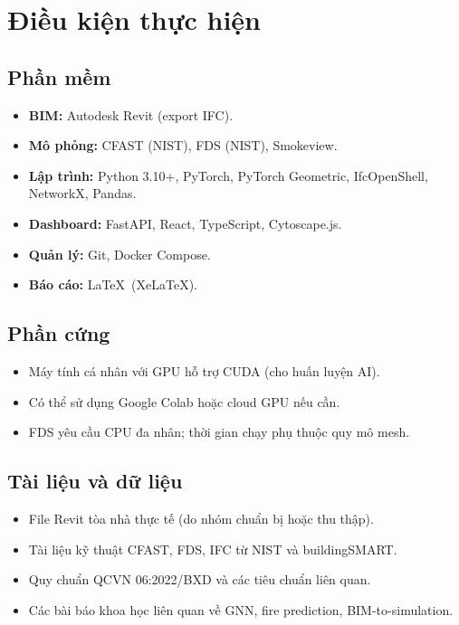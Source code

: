 \section{Điều kiện thực hiện}
\label{sec:dieuken}

\subsection{Phần mềm}

\begin{itemize}
  \item \textbf{BIM:} Autodesk Revit (export IFC).
  \item \textbf{Mô phỏng:} CFAST (NIST), FDS (NIST), Smokeview.
  \item \textbf{Lập trình:} Python 3.10+, PyTorch, PyTorch Geometric, IfcOpenShell, NetworkX, Pandas.
  \item \textbf{Dashboard:} FastAPI, React, TypeScript, Cytoscape.js.
  \item \textbf{Quản lý:} Git, Docker Compose.
  \item \textbf{Báo cáo:} \LaTeX\ (XeLaTeX).
\end{itemize}

\subsection{Phần cứng}

\begin{itemize}
  \item Máy tính cá nhân với GPU hỗ trợ CUDA (cho huấn luyện AI).
  \item Có thể sử dụng Google Colab hoặc cloud GPU nếu cần.
  \item FDS yêu cầu CPU đa nhân; thời gian chạy phụ thuộc quy mô mesh.
\end{itemize}

\subsection{Tài liệu và dữ liệu}

\begin{itemize}
  \item File Revit tòa nhà thực tế (do nhóm chuẩn bị hoặc thu thập).
  \item Tài liệu kỹ thuật CFAST, FDS, IFC từ NIST và buildingSMART.
  \item Quy chuẩn QCVN 06:2022/BXD và các tiêu chuẩn liên quan.
  \item Các bài báo khoa học liên quan về GNN, fire prediction, BIM-to-simulation.
\end{itemize}

